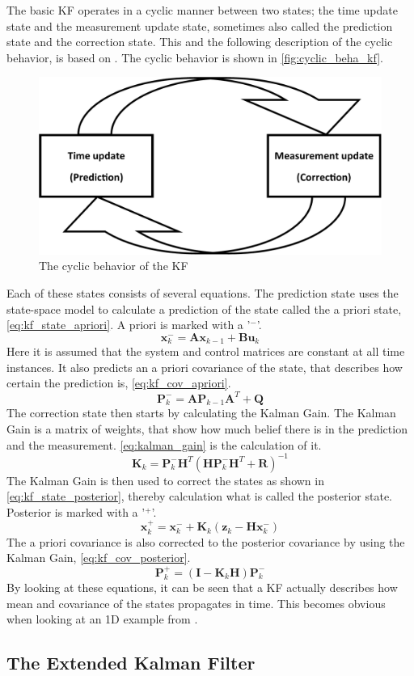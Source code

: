\documentclass[Main]{subfiles}
\begin{document}
The basic KF operates in a cyclic manner between two states; the time update state and the measurement update state, sometimes also called the prediction state and the correction state. 
This and the following description of the cyclic behavior, is based on \cite{Simon2006}.
The cyclic behavior is shown in \autoref{fig:cyclic_beha_kf}.
\begin{figure}[H]
	\centering
	\includegraphics[width=0.5\linewidth]{./Figures/kf_states.png}
	\caption{The cyclic behavior of the KF}
	\label{fig:cyclic_beha_kf}
\end{figure}\noindent
Each of these states consists of several equations. The prediction state uses the state-space model to calculate a prediction of the state called the a priori state, \autoref{eq:kf_state_apriori}.
A priori is marked with a '$^-$'.
\begin{equation}
\label{eq:kf_state_apriori}
\mathbf{x}_k^-=\mathbf{A} \mathbf{x}_{k-1} + \mathbf{B} \mathbf{u}_k
\end{equation}
Here it is assumed that the system and control matrices are constant at all time instances.
It also predicts an a priori covariance of the state, that describes how certain the prediction is, \autoref{eq:kf_cov_apriori}.
\begin{equation}
\label{eq:kf_cov_apriori}
\mathbf{P}_k^-=\mathbf{A} \mathbf{P}_{k-1} \mathbf{A}^T+\mathbf{Q}
\end{equation}
The correction state then starts by calculating the Kalman Gain. 
The Kalman Gain is a matrix of weights, that show how much belief there is in the prediction and the measurement. \autoref{eq:kalman_gain} is the calculation of it.
\begin{equation}
\label{eq:kalman_gain}
\mathbf{K}_k = \mathbf{P}_k^- \mathbf{H}^T (\mathbf{H} \mathbf{P}_k^- \mathbf{H}^T + \mathbf{R})^{-1}
\end{equation}
The Kalman Gain is then used to correct the states as shown in \autoref{eq:kf_state_posterior}, thereby calculation what is called the posterior state. 
Posterior is marked with a '$^+$'.
\begin{equation}
\label{eq:kf_state_posterior}
\mathbf{x}_k^+ = \mathbf{x}_k^- + \mathbf{K}_k (\mathbf{z}_k - \mathbf{H} \mathbf{x}_k^-)
\end{equation}
The a priori covariance is also corrected to the posterior covariance by using the Kalman Gain, \autoref{eq:kf_cov_posterior}.
\begin{equation}
\label{eq:kf_cov_posterior}
\mathbf{P}_k^+ = (\mathbf{I} - \mathbf{K}_k \mathbf{H}) \mathbf{P}_k^-
\end{equation}
By looking at these equations, it can be seen that a KF actually describes how mean and covariance of the states propagates in time.
This becomes obvious when looking at an 1D example from \citep{Thrun2002}.


\subsection{The Extended Kalman Filter}
\end{document}
